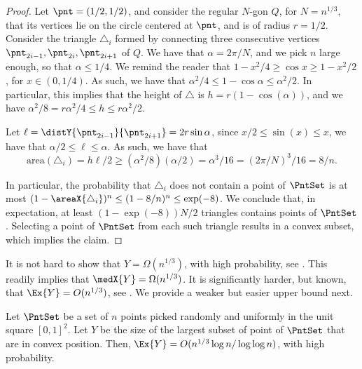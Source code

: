 \begin{proof}
    Let $\pnt = (1/2,1/2)$, and consider the regular $N$-gon $Q$, for
    $N = n^{1/3}$, that its vertices lie on the circle centered at
    $\pnt$, and is of radius $r=1/2$. Consider the triangle
    $\triangle_i$ formed by connecting three consecutive vertices
    $\pnt_{2i-1}, \pnt_{2i}, \pnt_{2i+1}$ of $Q$. We have that
    $\alpha = 2\pi / N$, and we pick $n$ large enough, so that
    $\alpha \leq 1/4$. We remind the reader that
    $1-x^2/4 \geq \cos x \geq 1-x^2/2$, for $x \in (0,1/4)$. As such,
    we have that $\alpha^2/4 \leq 1-\cos \alpha \leq \alpha^2/2$. In
    particular, this implies that the height of $\triangle$ is
    $h = r(1-\cos(\alpha))$, and we have
    $\alpha^2/8 = r\alpha^2/4 \leq h \leq r \alpha^2/2$.

    Let $\ell = \distY{\pnt_{2i-1}}{\pnt_{2i+1}} = 2 r \sin \alpha$,
    since $x/2 \leq \sin(x) \leq x$, we have that
    $\alpha/2 \leq \ell \leq \alpha$. As such, we have that
    \begin{equation*}
        \mathrm{area}(\triangle_i) = h \ell /2%
        \geq%
        (\alpha^2/8) (\alpha/2)%
        =%
        \alpha^3/16
        =%
        (2\pi / N)^3 /16%
        =%
        8 /n.
    \end{equation*}

    In particular, the probability that $\triangle_i$ does not contain
    a point of $\PntSet$ is at most
    $(1-\areaX{\triangle_i})^n \leq (1-8/n)^n \leq \exp(-8)$.  We
    conclude that, in expectation, at least $(1-\exp(-8))N/2$
    triangles contains points of $\PntSet$. Selecting a point of
    $\PntSet$ from each such triangle results in a convex subset,
    which implies the claim.
\end{proof}

It is not hard to show that $Y = \Omega(n^{1/3})$, with high
probability, see . This readily implies that
$\medX{Y} = \Omega(n^{1/3})$. It is significantly harder, but known,
that $\Ex{Y} =O(n^{1/3})$, see \cite{v-pnrpc-94}. We provide a weaker
but easier upper bound next.




\begin{lemma}
    Let $\PntSet$ be a set of $n$ points picked randomly and uniformly
    in the unit square $[0,1]^2$. Let $Y$ be the size of the largest
    subset of point of $\PntSet$ that are in convex position. Then,
    $\Ex{Y} = O(n^{1/3} \log n / \log \log n)$, with high probability.
\end{lemma}

